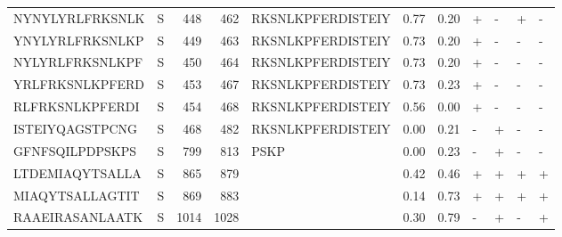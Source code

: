 \begin{tabular}{llrrlrrllll}
NYNYLYRLFRKSNLK &       S &    448 &   462 &  RKSNLKPFERDISTEIY &            0.77 &             0.20 &      + &       - &      + &       - \\
YNYLYRLFRKSNLKP &       S &    449 &   463 &  RKSNLKPFERDISTEIY &            0.73 &             0.20 &      + &       - &      - &       - \\
NYLYRLFRKSNLKPF &       S &    450 &   464 &  RKSNLKPFERDISTEIY &            0.73 &             0.20 &      + &       - &      - &       - \\
YRLFRKSNLKPFERD &       S &    453 &   467 &  RKSNLKPFERDISTEIY &            0.73 &             0.23 &      + &       - &      - &       - \\
RLFRKSNLKPFERDI &       S &    454 &   468 &  RKSNLKPFERDISTEIY &            0.56 &             0.00 &      + &       - &      - &       - \\
ISTEIYQAGSTPCNG &       S &    468 &   482 &  RKSNLKPFERDISTEIY &            0.00 &             0.21 &      - &       + &      - &       - \\
GFNFSQILPDPSKPS &       S &    799 &   813 &               PSKP &            0.00 &             0.23 &      - &       + &      - &       - \\
LTDEMIAQYTSALLA &       S &    865 &   879 &                    &            0.42 &             0.46 &      + &       + &      + &       + \\
MIAQYTSALLAGTIT &       S &    869 &   883 &                    &            0.14 &             0.73 &      + &       + &      + &       + \\
RAAEIRASANLAATK &       S &   1014 &  1028 &                    &            0.30 &             0.79 &      - &       + &      - &       + \\
\bottomrule
\end{tabular}
